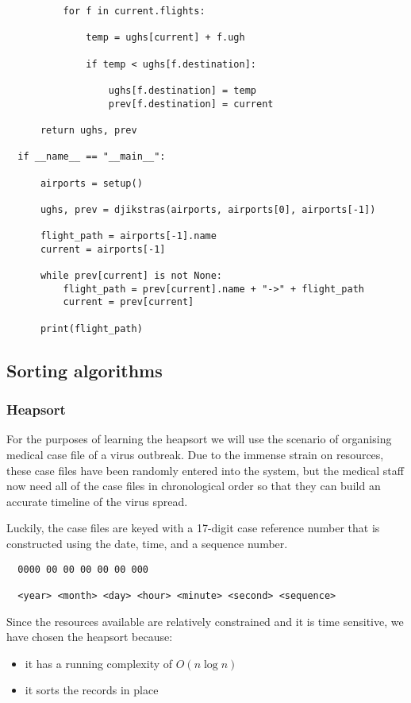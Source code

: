 \documentclass[11pt]{article}
\begin{document}
\begin{enumerate}
\begin{enumerate}
\begin{verbatim}
          for f in current.flights:
             
              temp = ughs[current] + f.ugh
              
              if temp < ughs[f.destination]:
             
                  ughs[f.destination] = temp
                  prev[f.destination] = current

      return ughs, prev

  if __name__ == "__main__":
      
      airports = setup()
      
      ughs, prev = djikstras(airports, airports[0], airports[-1]) 

      flight_path = airports[-1].name
      current = airports[-1]

      while prev[current] is not None:
          flight_path = prev[current].name + "->" + flight_path
          current = prev[current]

      print(flight_path)
\end{verbatim}
\end{enumerate}
\end{enumerate}

\subsection{Sorting algorithms}
\label{sorting-algorithms}
\subsubsection{Heapsort}
\label{heapsort}
For the purposes of learning the heapsort we will use the scenario of
organising medical case file of a virus outbreak. Due to the immense
strain on resources, these case files have been randomly entered into
the system, but the medical staff now need all of the case files in
chronological order so that they can build an accurate timeline of the
virus spread.

Luckily, the case files are keyed with a 17-digit case reference number
that is constructed using the date, time, and a sequence number.

\begin{verbatim}
  0000 00 00 00 00 00 000

  <year> <month> <day> <hour> <minute> <second> <sequence>
\end{verbatim}

Since the resources available are relatively constrained and it is time
sensitive, we have chosen the heapsort because:
\begin{itemize}
\item it has a running complexity of \(O(n\log{}n)\)
\item it sorts the records in place
\end{itemize}
\end{document}
